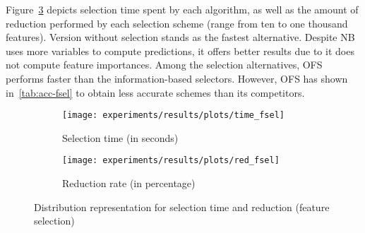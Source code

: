 \documentclass[preprint,12pt]{elsarticle}
\begin{document}
\begin{table}[!htp]
\renewcommand{\arraystretch}{1.3}
\centering
\scriptsize
\caption{Wilcoxon test results and average rankings of methods (Friedman Procedure \& Adjusted p-value with Holm's Test) for accuracy}
\label{tab:friedman-fsel}
\end{table}


Figure~\ref{fig:fsel} depicts selection time spent by each algorithm, as well as the amount of reduction performed by each selection scheme (range from ten to one thousand features).
Version without selection stands as the fastest alternative. Despite NB uses more variables to compute predictions, it offers better results due to it does not compute feature importances. Among the selection alternatives, OFS performs faster than the information-based selectors. However, OFS has shown in~\ref{tab:acc-fsel} to obtain less accurate schemes than its competitors. 

\begin{figure}
\begin{subfigure}{.5\textwidth}
  \centering
  \texttt{[image: experiments/results/plots/time\_fsel]}
  \caption{Selection time (in seconds)}
  \label{fig:time-fsel}
\end{subfigure}%
\begin{subfigure}{.5\textwidth}
  \centering
  \texttt{[image: experiments/results/plots/red\_fsel]}
  \caption{Reduction rate (in percentage)}
  \label{fig:red-fsel}
\end{subfigure}
\caption{Distribution representation for selection time and reduction (feature selection)}
\label{fig:fsel}
\end{figure}
\end{document}
